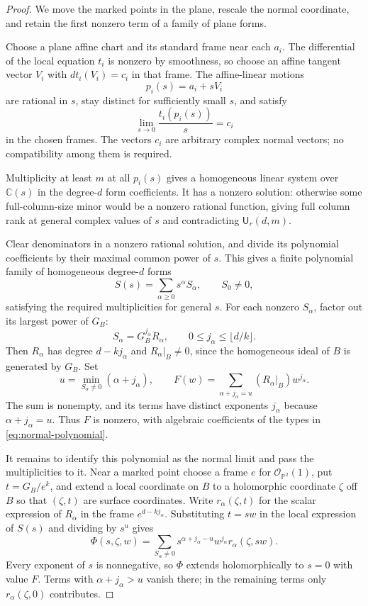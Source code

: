 \begin{proof}
We move the marked points in the plane, rescale the normal coordinate, and retain the first nonzero term of a family of plane forms.

Choose a plane affine chart and its standard frame near each $a_i$. The differential of the local equation $t_i$ is nonzero by smoothness, so choose an affine tangent vector $V_i$ with $dt_i(V_i)=c_i$ in that frame.  The affine-linear motions
\[
 p_i(s)=a_i+sV_i
\]
are rational in $s$, stay distinct for sufficiently small $s$, and satisfy
\[
 \lim_{s\to0}\frac{t_i(p_i(s))}{s}=c_i
\]
in the chosen frames.  The vectors $c_i$ are arbitrary complex normal vectors; no compatibility among them is required.

Multiplicity at least $m$ at all $p_i(s)$ gives a homogeneous linear system over $\mathbb{C}(s)$ in the degree-$d$ form coefficients.  It has a nonzero solution: otherwise some full-column-size minor would be a nonzero rational function, giving full column rank at general complex values of $s$ and contradicting $\mathsf U_r(d,m)$.

Clear denominators in a nonzero rational solution, and divide its polynomial coefficients by their maximal common power of $s$.  This gives a finite polynomial family of homogeneous degree-$d$ forms
\[
 S(s)=\sum_{\alpha\ge0}s^\alpha S_\alpha,
 \qquad S_0\ne0,
\]
satisfying the required multiplicities for general $s$.  For each nonzero $S_\alpha$, factor out its largest power of $G_B$:
\[
 S_\alpha=G_B^{j_\alpha}R_\alpha,
 \qquad
 0\le j_\alpha\le\lfloor d/k\rfloor.
\]
Then $R_\alpha$ has degree $d-kj_\alpha$ and $R_\alpha|_B\ne0$, since the homogeneous ideal of $B$ is generated by $G_B$. Set
\[
 u=\min_{S_\alpha\ne0}(\alpha+j_\alpha),
 \qquad
 F(w)=\sum_{\alpha+j_\alpha=u}
       (R_\alpha|_B)w^{j_\alpha}.
\]
The sum is nonempty, and its terms have distinct exponents $j_\alpha$ because $\alpha+j_\alpha=u$.  Thus $F$ is nonzero, with algebraic coefficients of the types in \eqref{eq:normal-polynomial}.

It remains to identify this polynomial as the normal limit and pass the multiplicities to it.  Near a marked point choose a frame $e$ for $\mathcal{O}_{\mathbb{P}^2}(1)$, put $t=G_B/e^k$, and extend a local coordinate on $B$ to a holomorphic coordinate $\zeta$ off $B$ so that $(\zeta,t)$ are surface coordinates.  Write $r_\alpha(\zeta,t)$ for the scalar expression of $R_\alpha$ in the frame $e^{d-kj_\alpha}$.  Substituting $t=sw$ in the local expression of $S(s)$ and dividing by $s^u$ gives
\[
 \Phi(s,\zeta,w)
 =\sum_{S_\alpha\ne0}
 s^{\alpha+j_\alpha-u}w^{j_\alpha}
 r_\alpha(\zeta,sw).
\]
Every exponent of $s$ is nonnegative, so $\Phi$ extends holomorphically to $s=0$ with value $F$.  Terms with $\alpha+j_\alpha>u$ vanish there; in the remaining terms only $r_\alpha(\zeta,0)$ contributes.


\end{proof}
